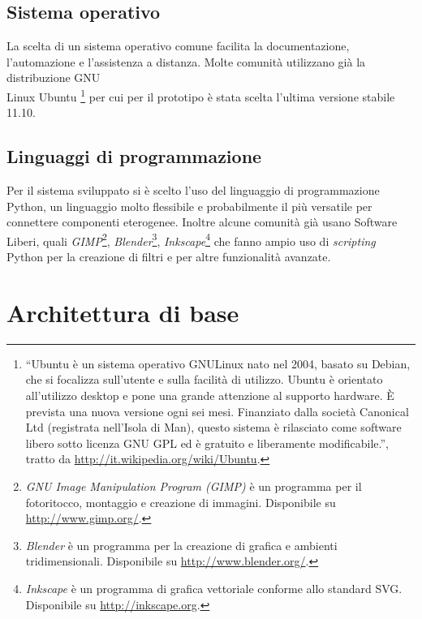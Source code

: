\subsection{Sistema operativo}
La scelta di un sistema operativo comune facilita la documentazione,
l'automazione e l'assistenza a distanza. Molte comunità utilizzano già
la distribuzione GNU\\Linux Ubuntu \footnote{``Ubuntu è un sistema
  operativo GNU\/Linux nato nel 2004, basato su Debian, che si
  focalizza sull'utente e sulla facilità di utilizzo. Ubuntu è
  orientato all'utilizzo desktop e pone una grande attenzione al
  supporto hardware. È prevista una nuova versione ogni sei mesi.
  Finanziato dalla società Canonical Ltd (registrata nell'Isola di
  Man), questo sistema è rilasciato come software libero sotto licenza
  GNU GPL ed è gratuito e liberamente modificabile.'', tratto da
  \url{http://it.wikipedia.org/wiki/Ubuntu}.} per cui per il prototipo
è stata scelta l'ultima versione stabile 11.10.

\subsection{Linguaggi di programmazione}
Per il sistema sviluppato si è scelto l'uso del linguaggio di
programmazione Python, un linguaggio molto flessibile e probabilmente
il più versatile per connettere componenti eterogenee. Inoltre alcune
comunità già usano Software Liberi, quali
\emph{GIMP}\footnote{\emph{GNU Image Manipulation Program (GIMP)} è un
  programma per il fotoritocco, montaggio e creazione di
  immagini. Disponibile su \url{http://www.gimp.org/}.},
\emph{Blender}\footnote{\emph{Blender} è un programma per la creazione
  di grafica e ambienti tridimensionali. Disponibile su
  \url{http://www.blender.org/}.},
\emph{Inkscape}\footnote{\emph{Inkscape} è un programma di grafica
  vettoriale conforme allo standard SVG. Disponibile su
  \url{http://inkscape.org}.} che fanno ampio uso di \emph{scripting}
Python per la creazione di filtri e per altre funzionalità avanzate.


\section{Architettura di base}

